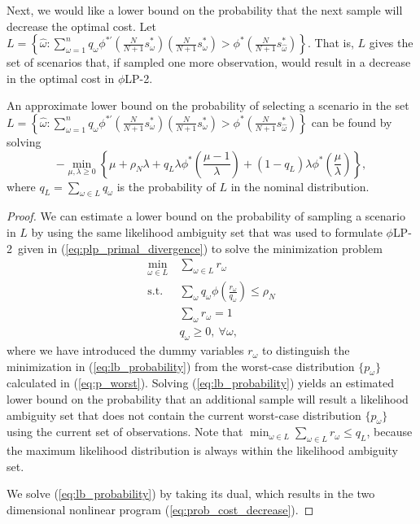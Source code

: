 \documentclass[ijoc,letterpaper]{informs3} %
\newcommand{\plp}{$\phi$LP-2}
\begin{document}
Next, we would like a lower bound on the probability that the next sample will decrease the optimal cost.
Let $L = \left\{ \hat{\omega} : \sum_{\omega=1}^n q_\omega \phi^{*\prime}\left(\frac{N}{N+1}s^*_\omega\right) \left(\frac{N}{N+1}s^*_\omega\right) > \phi^*\left(\frac{N}{N+1}s^*_{\hat{\omega}}\right) \right\}$.
That is, $L$ gives the set of scenarios that, if sampled one more observation, would result in a decrease in the optimal cost in \plp.

\begin{proposition}
	An approximate lower bound on the probability of selecting a scenario in the set $L = \left\{ \hat{\omega} : \sum_{\omega=1}^n q_\omega \phi^{*\prime}\left(\frac{N}{N+1}s^*_\omega\right) \left(\frac{N}{N+1}s^*_\omega\right) > \phi^*\left(\frac{N}{N+1}s^*_{\hat{\omega}}\right) \right\}$ can be found by solving 
	\begin{equation} \label{eq:prob_cost_decrease}
		-\min_{\mu,\lambda \geq 0} \left\{ \mu + \rho_N \lambda + q_L \lambda \phi^*\left(\frac{\mu-1}{\lambda}\right) + (1-q_L) \lambda \phi^*\left(\frac{\mu}{\lambda}\right) \right\},
	\end{equation}
	where $q_L = \sum_{\omega \in L} q_\omega$ is the probability of $L$ in the nominal distribution.
\end{proposition}

\begin{proof}
	We can estimate a lower bound on the probability of sampling a scenario in $L$ by using the same likelihood ambiguity set that was used to formulate \plp\ given in (\ref{eq:plp_primal_divergence}) to solve the minimization problem
	\begin{align}
		\min_{\omega \in L} \ & \sum_{\omega \in L} r_\omega \nonumber \\
		\mbox{s.t.} & \sum_\omega q_\omega \phi\left(\frac{r_\omega}{q_\omega}\right) \leq \rho_N \label{eq:lb_probability} \\
		& \sum_\omega r_\omega = 1 \nonumber \\
		& q_\omega \geq 0, \ \forall \omega, \nonumber
	\end{align}
	where we have introduced the dummy variables $r_\omega$ to distinguish the minimization in (\ref{eq:lb_probability}) from the worst-case distribution $\{p_\omega\}$ calculated in (\ref{eq:p_worst}). 
	Solving (\ref{eq:lb_probability}) yields an estimated lower bound on the probability that an additional sample will result a likelihood ambiguity set that does not contain the current worst-case distribution $\{p_\omega\}$ using the current set of observations.
	Note that $\min_{\omega \in L} \sum_{\omega \in L} r_\omega \leq q_L$, because the maximum likelihood distribution is always within the likelihood ambiguity set.

	We solve (\ref{eq:lb_probability}) by taking its dual, which results in the two dimensional nonlinear program (\ref{eq:prob_cost_decrease}).
\end{proof}
\end{document}

